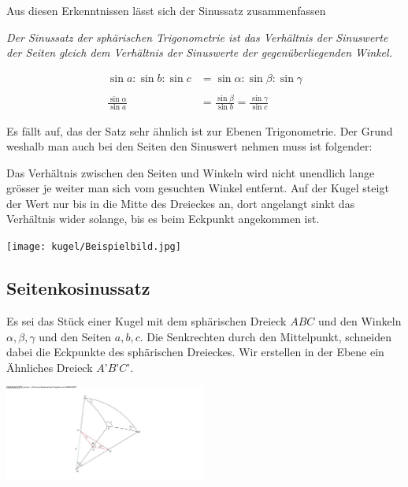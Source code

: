 \begin{refsection}
\begin{refsection}
Aus diesen Erkenntnissen lässt sich der Sinussatz zusammenfassen
\begin{satz}\textit{Der Sinussatz der sphärischen Trigonometrie ist das Verhältnis der Sinuswerte der Seiten gleich dem Verhältnis der Sinuswerte der gegenüberliegenden Winkel.}
\label{skript:kugel:satz:Sinussatz}
\end{satz}

\begin{align*}
\sin a : \sin b : \sin c &= \sin \alpha : \sin \beta : \sin \gamma \\
 \\
\frac{\sin \alpha}{\sin a} &= \frac{\sin \beta}{\sin b} = \frac{\sin \gamma}{\sin c}
\end{align*} 

Es fällt auf, das der Satz sehr ähnlich ist zur Ebenen Trigonometrie. Der Grund weshalb man auch bei den Seiten den Sinuswert nehmen muss ist folgender:

Das Verhältnis zwischen den Seiten und Winkeln wird nicht unendlich lange grösser je weiter man sich vom gesuchten Winkel entfernt. Auf der Kugel steigt der Wert nur bis in die Mitte des Dreieckes an, dort angelangt sinkt das Verhältnis wider solange, bis es beim Eckpunkt angekommen ist.

\begin{center}
        \texttt{[image: kugel/Beispielbild.jpg]}
\end{center}

\subsection{Seitenkosinussatz}
Es sei das Stück einer Kugel mit dem sphärischen Dreieck $ABC$ und den Winkeln $\alpha, \beta, \gamma$ und den Seiten $a, b, c$. Die Senkrechten durch den Mittelpunkt, schneiden dabei die Eckpunkte des sphärischen Dreieckes. Wir erstellen in der Ebene ein Ähnliches Dreieck $A’B’C’$.

\begin{center}
        \includegraphics[width=0.5\textwidth]{kugel/1Seintenkosinus.jpg}
\end{center}


\end{refsection}
\end{refsection}
